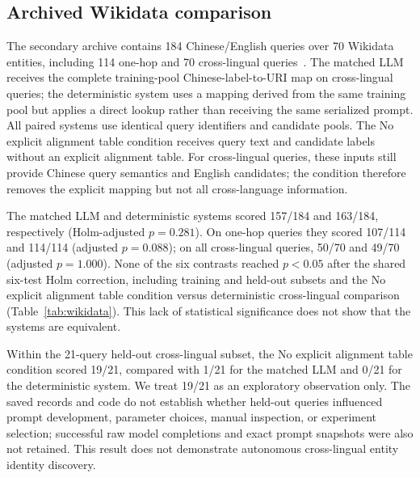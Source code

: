 \documentclass[a4paper,fleqn]{cas-dc}
\begin{document}
\begin{table}[t]
\centering\scriptsize

\caption{Three sensitivity runs. Query overlap counts are distinct query texts shared with the primary run. The 20260101 sensitivity run reuses the primary data seed; the runs are not independent replications.}
\label{tab:seeds}
\end{table}

\subsection{Archived Wikidata comparison}
The secondary archive contains 184 Chinese/English queries over 70 Wikidata entities, including 114 one-hop and 70 cross-lingual queries~\cite{wikidata2014}. The matched LLM receives the complete training-pool Chinese-label-to-URI map on cross-lingual queries; the deterministic system uses a mapping derived from the same training pool but applies a direct lookup rather than receiving the same serialized prompt. All paired systems use identical query identifiers and candidate pools. The No explicit alignment table condition receives query text and candidate labels without an explicit alignment table. For cross-lingual queries, these inputs still provide Chinese query semantics and English candidates; the condition therefore removes the explicit mapping but not all cross-language information.

The matched LLM and deterministic systems scored 157/184 and 163/184, respectively (Holm-adjusted $p=0.281$). On one-hop queries they scored 107/114 and 114/114 (adjusted $p=0.088$); on all cross-lingual queries, 50/70 and 49/70 (adjusted $p=1.000$). None of the six contrasts reached $p<0.05$ after the shared six-test Holm correction, including training and held-out subsets and the No explicit alignment table condition versus deterministic cross-lingual comparison (Table~\ref{tab:wikidata}). This lack of statistical significance does not show that the systems are equivalent.

Within the 21-query held-out cross-lingual subset, the No explicit alignment table condition scored 19/21, compared with 1/21 for the matched LLM and 0/21 for the deterministic system. We treat 19/21 as an exploratory observation only. The saved records and code do not establish whether held-out queries influenced prompt development, parameter choices, manual inspection, or experiment selection; successful raw model completions and exact prompt snapshots were also not retained. This result does not demonstrate autonomous cross-lingual entity identity discovery.
\end{document}
